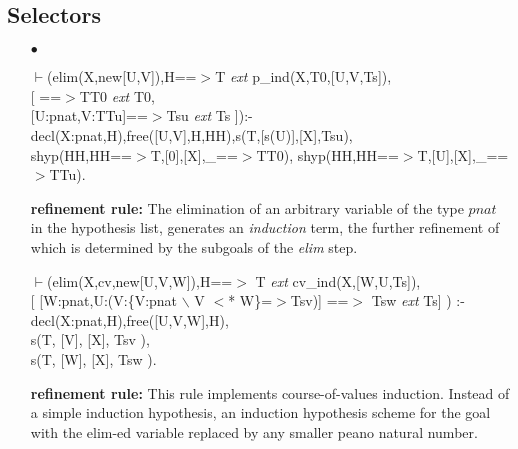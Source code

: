 \documentclass[11pt]{report}
\begin{document}
 \subsection{Selectors}
 \begin{enumerate}
 \item[$\bullet$]
\begin{sf}\begin{tabbing}
$\vdash$(elim(X,new[U,V]),H==$>$T \mbox{\it ext} p\_\hspace{0.1em}ind(X,T0,[U,V,Ts]),\\[-0.15ex]
\hspace{2em}[ ==$>$TT0 \mbox{\it ext} T0, \\[-0.15ex]
\hspace{3em}[U:pnat,V:TTu]==$>$Tsu \mbox{\it ext} Ts ]):-\\[-0.15ex]
\hspace{2em}decl(X:pnat,H),free([U,V],H,HH),s(T,[s(U)],[X],Tsu), \\[-0.15ex]
\hspace{2em}shyp(HH,HH==$>$T,[0],[X],\_\hspace{0.1em}==$>$TT0), shyp(HH,HH==$>$T,[U],[X],\_\hspace{0.1em}==$>$TTu).
\end{tabbing}\end{sf}

 {\bf refinement rule:}
 The elimination of an arbitrary variable of the type $pnat$ in
 the hypothesis list, generates an \emph{induction} term, the 
 further refinement of which is determined by the subgoals
 of the \emph{elim} step.
\begin{sf}\begin{tabbing}
$\vdash$(elim(X,cv,new[U,V,W]),H==$>$ T \mbox{\it ext} cv\_\hspace{0.1em}ind(X,[W,U,Ts]),\\[-0.15ex]
\hspace{2em}[ [W:pnat,U:(V:\{V:pnat $\backslash$ V $<$* W\}=$>$Tsv)] ==$>$ Tsw \mbox{\it ext} Ts] ) :-\\[-0.15ex]
\hspace{2em}decl(X:pnat,H),free([U,V,W],H),\\[-0.15ex]
\hspace{2em}s(T, [V], [X], Tsv ),\\[-0.15ex]
\hspace{2em}s(T, [W], [X], Tsw ).
\end{tabbing}\end{sf}

 {\bf refinement rule:}
 This rule implements course-of-values induction.  Instead of a simple
 induction hypothesis, an induction hypothesis scheme for the goal
 with the elim-ed variable replaced by any smaller peano natural number.
 

\end{enumerate}
\end{document}
